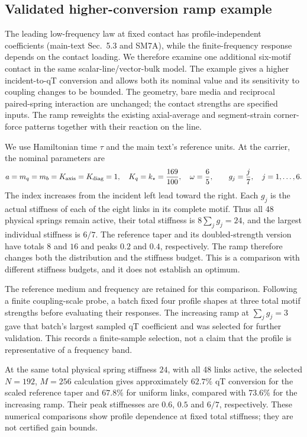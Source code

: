 \subsection{Validated higher-conversion ramp example}
\label{sec:sm-ramp-validation}

The leading low-frequency law at fixed contact has profile-independent coefficients (main-text Sec.~5.3 and SM7A), while the finite-frequency response depends on the contact loading. We therefore examine one additional six-motif contact in the same scalar-line/vector-bulk model. The example gives a higher incident-to-qT conversion and allows both its nominal value and its sensitivity to coupling changes to be bounded. The geometry, bare media and reciprocal paired-spring interaction are unchanged; the contact strengths are specified inputs. The ramp reweights the existing axial-average and segment-strain corner-force patterns together with their reaction on the line.

We use Hamiltonian time $\tau$ and the main text's reference units. At the carrier, the nominal parameters are
\begin{equation}
 a=m_q=m_b=K_{\rm axis}=K_{\rm diag}=1,
 \quad K_q=k_\star=\frac{169}{100},\quad \omega=\frac65,
 \qquad g_j=\frac{j}{7},\quad j=1,\ldots,6.
 \label{eq:sm-ramp-configuration}
\end{equation}
The index increases from the incident left lead toward the right. Each $g_j$ is the actual stiffness of each of the eight links in its complete motif. Thus all 48 physical springs remain active, their total stiffness is $8\sum_jg_j=24$, and the largest individual stiffness is $6/7$. The reference taper and its doubled-strength version have totals $8$ and $16$ and peaks $0.2$ and $0.4$, respectively. The ramp therefore changes both the distribution and the stiffness budget. This is a comparison with different stiffness budgets, and it does not establish an optimum.

The reference medium and frequency are retained for this comparison. Following a finite coupling-scale probe, a batch fixed four profile shapes at three total motif strengths before evaluating their responses. The increasing ramp at $\sum_jg_j=3$ gave that batch's largest sampled qT coefficient and was selected for further validation. This records a finite-sample selection, not a claim that the profile is representative of a frequency band.

At the same total physical spring stiffness $24$, with all 48 links active, the selected $N=192$, $M=256$ calculation gives approximately $62.7\%$ qT conversion for the scaled reference taper and $67.8\%$ for uniform links, compared with $73.6\%$ for the increasing ramp. Their peak stiffnesses are $0.6$, $0.5$ and $6/7$, respectively. These numerical comparisons show profile dependence at fixed total stiffness; they are not certified gain bounds.

